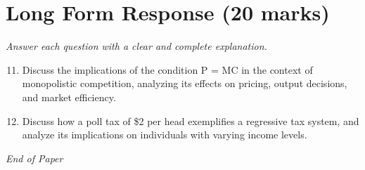 \documentclass[12pt]{article}
\begin{document}
\section*{Long Form Response (20 marks)}
\textit{Answer each question with a clear and complete explanation.}
\begin{enumerate}[label=\arabic*.]
\setcounter{enumi}{10}
\item Discuss the implications of the condition P = MC in the context of monopolistic competition, analyzing its effects on pricing, output decisions, and market efficiency.
\item Discuss how a poll tax of \$2 per head exemplifies a regressive tax system, and analyze its implications on individuals with varying income levels.
\end{enumerate}

\vfill
\noindent\textit{End of Paper}
\end{document}
